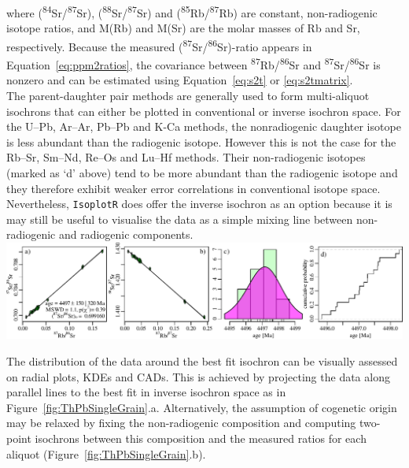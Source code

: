\begin{refsection}
\noindent where (\textsuperscript{84}Sr/\textsuperscript{87}Sr),
(\textsuperscript{88}Sr/\textsuperscript{87}Sr) and
(\textsuperscript{85}Rb/\textsuperscript{87}Rb) are constant,
non-radiogenic isotope ratios, and M(Rb) and M(Sr) are the molar
masses of Rb and Sr, respectively. Because the measured
(\textsuperscript{87}Sr/\textsuperscript{86}Sr)-ratio appears in
Equation~\ref{eq:ppm2ratios}, the covariance between
\textsuperscript{87}Rb/\textsuperscript{86}Sr and
\textsuperscript{87}Sr/\textsuperscript{86}Sr is nonzero and can be
estimated using Equation~\ref{eq:s2t} or \ref{eq:s2tmatrix}.\\

The parent-daughter pair methods are generally used to form
multi-aliquot isochrons that can either be plotted in conventional or
inverse isochron space. For the U--Pb, Ar--Ar, Pb--Pb and K-Ca
methods, the nonradiogenic daughter isotope is less abundant than the
radiogenic isotope. However this is not the case for the Rb--Sr,
Sm--Nd, Re--Os and Lu--Hf methods. Their non-radiogenic isotopes
(marked as `d' above) tend to be more abundant than the radiogenic
isotope and they therefore exhibit weaker error correlations in
conventional isotope space. Nevertheless, \texttt{IsoplotR} does offer
the inverse isochron as an option because it is may still be useful to
visualise the data as a simple mixing line between non-radiogenic and
radiogenic components.\\

\noindent\includegraphics[width=\textwidth]{../figures/RbSr.pdf}
\begingroup{}
\label{fig:RbSrabcd}\endgroup

The distribution of the data around the best fit isochron can be
visually assessed on radial plots, KDEs and CADs. This is achieved by
projecting the data along parallel lines to the best fit in inverse
isochron space as in
Figure~\ref{fig:ThPbSingleGrain}.a. Alternatively, the assumption of
cogenetic origin may be relaxed by fixing the non-radiogenic
composition and computing two-point isochrons between this composition
and the measured ratios for each aliquot
(Figure~\ref{fig:ThPbSingleGrain}.b).

\printbibliography[heading=subbibliography]

\end{refsection}
